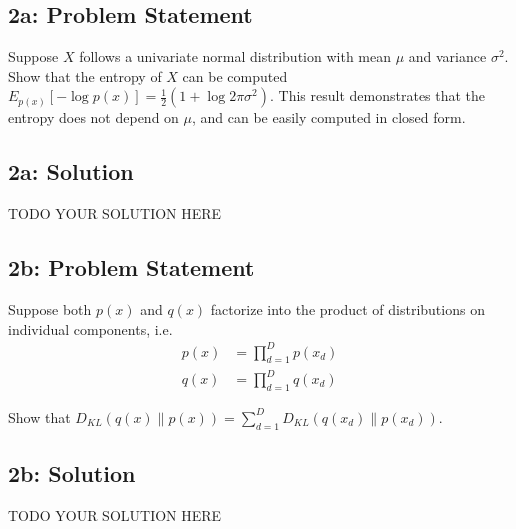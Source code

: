 \documentclass[10pt]{article}
\newcommand{\officialdirections}[1]{{\color{purple} #1}}
\begin{document}
\newpage
\officialdirections{\subsection*{2a: Problem Statement}
Suppose $X$ follows a univariate normal distribution with mean $\mu$ and variance $\sigma^2$. Show that the entropy  of $X$ can be computed $E_{p(x)}[-\log p(x)] = \frac{1}{2}\left(1+\log 2 \pi \sigma^2\right)$. This result demonstrates that the entropy does not depend on $\mu$, and can be easily computed in closed form.
}

\subsection{2a: Solution}
TODO YOUR SOLUTION HERE



\newpage
\officialdirections{\subsection*{2b: Problem Statement}
Suppose both $p(x)$ and $q(x)$ factorize into the product of distributions on individual components, i.e. 
\begin{align*}
p(x) &= \prod_{d=1}^D p(x_d)\\
q(x) &= \prod_{d=1}^D q(x_d)
\end{align*}

Show that $D_{KL}(q(x) \lVert p(x)) = \sum_{d=1}^D D_{KL}(q(x_d) \lVert p(x_d))$.
}

\subsection{2b: Solution}
TODO YOUR SOLUTION HERE
\end{document}

